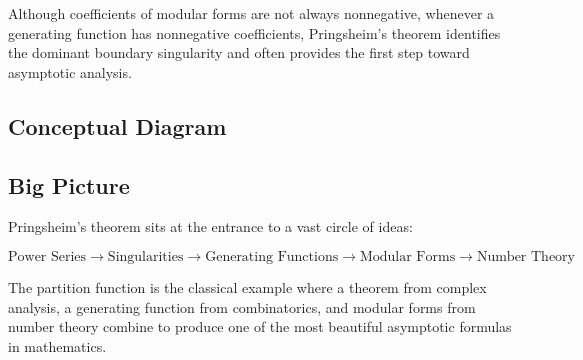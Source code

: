 \documentclass[12pt,a4paper]{article}
\theoremstyle{notespace}
\begin{document}
Although coefficients of modular forms are not always nonnegative, whenever a generating function has nonnegative coefficients, Pringsheim's theorem identifies the dominant boundary singularity and often provides the first step toward asymptotic analysis.

\bigskip

\subsection{Conceptual Diagram}

\begin{center}
\end{center}

\bigskip

\subsection{Big Picture}

Pringsheim's theorem sits at the entrance to a vast circle of ideas:

\[
\boxed{
	\text{Power Series}
	\rightarrow
	\text{Singularities}
	\rightarrow
	\text{Generating Functions}
	\rightarrow
	\text{Modular Forms}
	\rightarrow
	\text{Number Theory}
}
\]

The partition function is the classical example where a theorem from complex analysis, a generating function from combinatorics, and modular forms from number theory combine to produce one of the most beautiful asymptotic formulas in mathematics.
\end{document}
